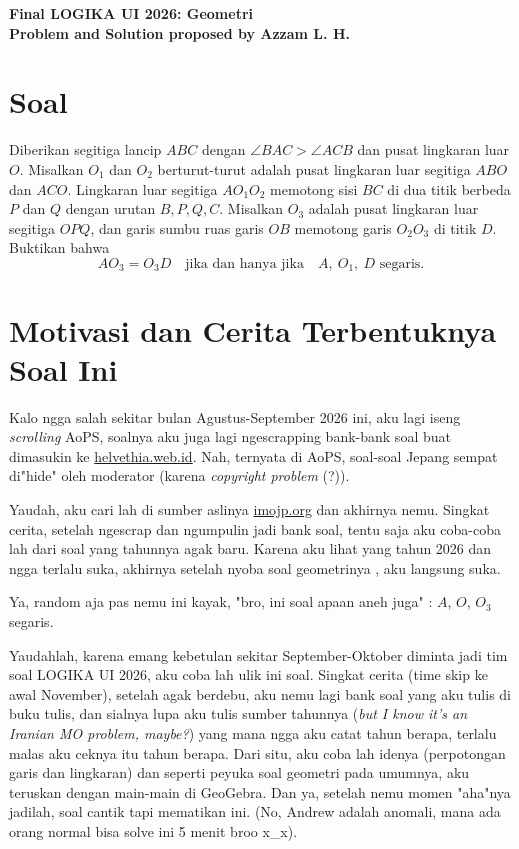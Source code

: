 \begin{center}
    {\color{crimson}\textbf{\Huge Final LOGIKA UI 2026: Geometri}}\\[4pt]
    {\color{inksoft}\textbf{\large Problem and Solution proposed by Azzam L. H.}}
\end{center}

\section{Soal}
Diberikan segitiga lancip $ABC$ dengan $\angle BAC > \angle ACB$ dan pusat lingkaran luar $O$. Misalkan $O_1$ dan $O_2$ berturut-turut adalah pusat lingkaran luar segitiga $ABO$ dan $ACO$. Lingkaran luar segitiga $AO_1O_2$ memotong sisi $BC$ di dua titik berbeda $P$ dan $Q$ dengan urutan $B, P, Q, C$. Misalkan $O_3$ adalah pusat lingkaran luar segitiga $OPQ$, dan garis sumbu ruas garis $OB$ memotong garis $O_2O_3$ di titik $D$. Buktikan bahwa
\[
    AO_3 = O_3D \quad\text{jika dan hanya jika}\quad A,\ O_1,\ D \text{ segaris.}
\]



\newpage
\section{Motivasi dan Cerita Terbentuknya Soal Ini}
Kalo ngga salah sekitar bulan Agustus-September 2026 ini, aku lagi iseng \textit{scrolling} AoPS, soalnya aku juga lagi ngescrapping bank-bank soal buat dimasukin ke \url{helvethia.web.id}. Nah, ternyata di AoPS, soal-soal Jepang sempat di"hide" oleh moderator (karena \textit{copyright problem} (?)).

Yaudah, aku cari lah di sumber aslinya \url{imojp.org} dan akhirnya nemu. Singkat cerita, setelah ngescrap dan ngumpulin jadi bank soal, tentu saja aku coba-coba lah dari soal yang tahunnya agak baru. Karena aku lihat yang tahun 2026 dan ngga terlalu suka, akhirnya setelah nyoba soal geometrinya , aku langsung suka. 

Ya, random aja pas nemu ini kayak, "bro, ini soal apaan aneh juga" : $A$, $O$, $O_3$ segaris.

Yaudahlah, karena emang kebetulan sekitar September-Oktober diminta jadi tim soal LOGIKA UI 2026, aku coba lah ulik ini soal. Singkat cerita (time skip ke awal November), setelah agak berdebu, aku nemu lagi bank soal yang aku tulis di buku tulis, dan sialnya lupa aku tulis sumber tahunnya (\textit{but I know it's an Iranian MO problem, maybe?}) yang mana ngga aku catat tahun berapa, terlalu malas aku ceknya itu tahun berapa. Dari situ, aku coba lah idenya (perpotongan garis dan lingkaran) dan seperti peyuka soal geometri pada umumnya, aku teruskan dengan main-main di GeoGebra. Dan ya, setelah nemu momen "aha"nya jadilah, soal cantik tapi mematikan ini. (No, Andrew adalah anomali, mana ada orang normal bisa solve ini 5 menit broo x\_x).

